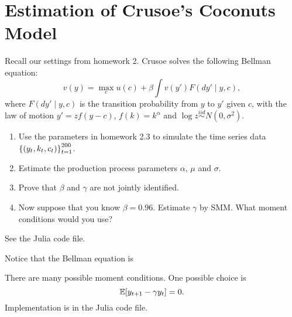 \documentclass[12pt]{article}
\begin{document}
\section{Estimation of Crusoe's Coconuts Model}
Recall our settings from homework 2. Crusoe solves the following Bellman equation: 
\begin{equation*}
    v(y) = \max_{c} u(c) + \beta \int v(y') F(dy'\mid y, c),
\end{equation*}
where $F(dy'\mid y, c)$ is the transition probability from $y$ to $y'$ given $c$, 
with the law of motion $y' = zf(y - c)$, $f(k) = k^\alpha$ and $\log z\overset{iid}{\sim} N(0, \sigma^2)$.
\begin{enumerate}
    \item Use the parameters in homework 2.3 to simulate the time series data 
    $\left\{ {(y_t, k_t, c_t)} \right\}_{t=1}^{200}$. 
    \item Estimate the production process parameters $\alpha$, $\mu$ and $\sigma$. 
    \item Prove that $\beta$ and $\gamma$ are not jointly identified. 
    \item Now suppose that you know $\beta = 0.96$. Estimate $\gamma$ by SMM. What 
    moment conditions would you use?
\end{enumerate}
\begin{sol}[1.1, 1.2]
    See the Julia code file.
\end{sol} 

\begin{sol}[1.3]
    Notice that the Bellman equation is
\end{sol}

\begin{sol}[1.4]
    There are many possible moment conditions. One possible choice is
    \begin{equation*}
        \Ex{y_{t+1} - \gamma y_t} = 0.
    \end{equation*}
    Implementation is in the Julia code file.
\end{sol}
\end{document}
